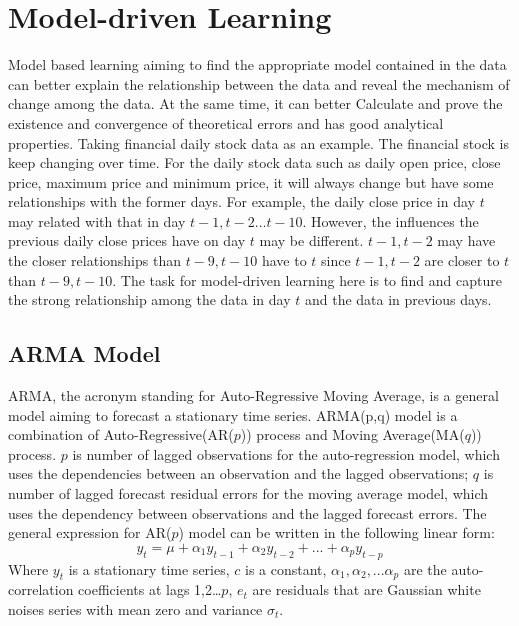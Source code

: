 \section{Model-driven Learning}
\vspace{-0.10in}
Model based learning aiming to find the appropriate model contained in the data can better explain the relationship between the data and reveal the mechanism of change among the data. At the same time, it can better Calculate and prove the existence and convergence of theoretical errors and has good analytical properties. Taking financial daily stock data as an example. The financial stock is keep changing over time. For the daily stock data such as daily open price, close price, maximum price and minimum price, it will always change but have some relationships with the former days. For example, the daily close price in day $t$ may related with that in day $t-1, t-2…t-10$. However, the influences the previous daily close prices have on day $t$ may be different. $t-1, t-2$ may have the closer relationships than $t-9, t-10$ have to $t$ since $t-1, t-2$ are closer to $t$ than $t-9, t-10$. The task for model-driven learning here is to find and capture the strong relationship among the data in day $t$ and the data in previous days.
\subsection{ARMA Model}
\vspace{-0.05in}
ARMA, the acronym standing for Auto-Regressive Moving Average, is a general model aiming to forecast a stationary time series. ARMA(p,q) model is a combination of Auto-Regressive(AR($p$)) process and Moving Average(MA($q$)) process. $p$ is number of lagged observations for the auto-regression model, which uses the dependencies between an observation and the lagged observations; $q$ is number of lagged forecast residual errors for the moving average model, which uses the dependency between observations and the lagged forecast errors. 
The general expression for AR($p$) model can be written in the following linear form:
\begin{equation}
				y_t = \mu + \alpha_1{y_{t-1}}+\alpha_2{y_{t-2}}+...+\alpha_p{y_{t-p}}
\end{equation}
Where $y_t$ is a stationary time series, $c$ is a constant, $\alpha_1,\alpha_2,...\alpha_p$ are the auto-correlation coefficients at lags 1,2…$p$, $e_t$ are residuals that are Gaussian white noises series with mean zero and variance $\sigma_t$.

